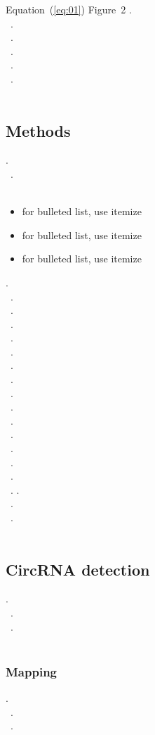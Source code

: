\documentclass{bioinfo}
\begin{document}
Equation~(\ref{eq:01}) 
Figure~2\vphantom{\ref{fig:02}} 
\citealp{Boffelli03} 
.\\\
.\\\
.\\\
.\\\
.\\\
.\\\



\begin{methods}
\section{Methods}

.\\\
.\\\
\vspace*{1pt}

\begin{itemize}
\item for bulleted list, use itemize
\item for bulleted list, use itemize
\item for bulleted list, use itemize\vspace*{1pt}
\end{itemize}
.\\\
.\\\
.\\\
.\\\
.\\\
.\\\
.\\\
.\\\
.\\\
.\\\
.\\\
.\\\
.\\\
.\\\
.\\\
\vadjust{\newpage}.
.\\\
.\\\
.\\\
\subsection{CircRNA detection}
.\\\
.\\\
.\\\
\subsubsection{Mapping}
.\\\
.\\\
.\\\

\end{methods}
\end{document}
